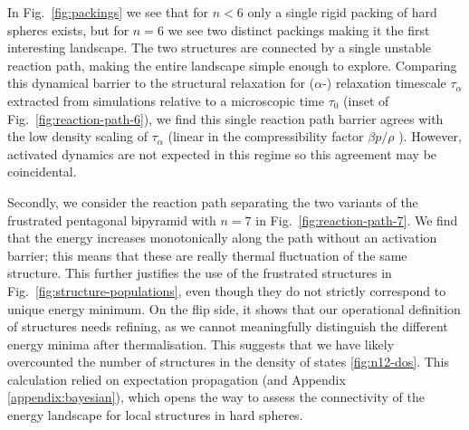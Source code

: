 \documentclass[11pt,twoside]{report}
\begin{document}
In Fig.\ \ref{fig:packings} we see that for $n < 6$ only a single rigid packing of hard spheres exists, but for $n=6$ we see two distinct packings making it the first interesting landscape.
The two structures are connected by a single unstable reaction path, making the entire landscape simple enough to explore.
Comparing this dynamical barrier to the structural relaxation for ($\alpha$-) relaxation timescale $\tau_\alpha$ extracted from simulations relative to a microscopic time $\tau_0$ (inset of Fig.\ \ref{fig:reaction-path-6}), we find this single reaction path barrier agrees with the low density scaling of $\tau_\alpha$ (linear in the compressibility factor $\beta p / \rho$ \cite{BerthierPRE2009}).
However, activated dynamics are not expected in this regime so this agreement may be coincidental.

Secondly, we consider the reaction path separating the two variants of the frustrated pentagonal bipyramid with $n=7$ in Fig.\ \ref{fig:reaction-path-7}.
We find that the energy increases monotonically along the path without an activation barrier; this means that these are really thermal fluctuation of the same structure.
This further justifies the use of the frustrated structures in Fig.\ \ref{fig:structure-populations}, even though they do not strictly correspond to unique energy minimum.
On the flip side, it shows that our operational definition of structures needs refining, as we cannot meaningfully distinguish the different energy minima after thermalisation.
This suggests that we have likely overcounted the number of structures in the density of states \ref{fig:n12-dos}.
This calculation relied on expectation propagation \cite{MinkaUAI2001,Minka2001,Rasmussen2006,Cunningham2011} (and Appendix \ref{appendix:bayesian}), which opens the way to assess the connectivity of the energy landscape for local structures in hard spheres.
\end{document}
